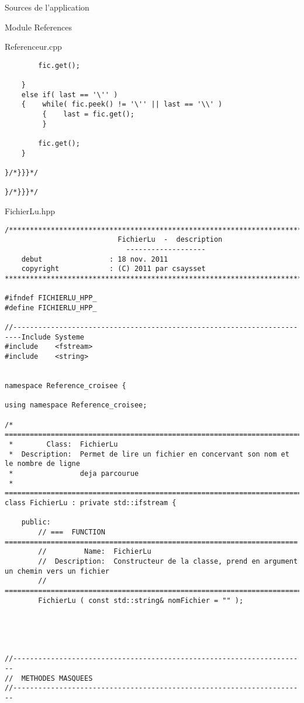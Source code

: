 \documentclass{article}
\begin{document}
\begin{section}{Sources de l'application}
\begin{subsection}{Module References}
\begin{paragraph}{Referenceur.cpp}
\begin{verbatim}
        fic.get();

    }
    else if( last == '\'' ) 
    {    while( fic.peek() != '\'' || last == '\\' ) 
         {    last = fic.get();
         }

        fic.get();
    }

}/*}}}*/

}/*}}}*/
  \end{verbatim}
  \end{paragraph}





\newpage
  \begin{paragraph}{FichierLu.hpp}
   \begin{verbatim}/*************************************************************************
                           FichierLu  -  description
                             -------------------
    debut                : 18 nov. 2011
    copyright            : (C) 2011 par csaysset
*************************************************************************/

#ifndef FICHIERLU_HPP_
#define FICHIERLU_HPP_

//------------------------------------------------------------------------Include Systeme
#include    <fstream>
#include    <string>


namespace Reference_croisee {

using namespace Reference_croisee;

/* =====================================================================================
 *        Class:  FichierLu
 *  Description:  Permet de lire un fichier en concervant son nom et le nombre de ligne
 *                deja parcourue
 * =====================================================================================*/
class FichierLu : private std::ifstream {

    public:
        // ===  FUNCTION  ======================================================================
        //         Name:  FichierLu
        //  Description:  Constructeur de la classe, prend en argument un chemin vers un fichier
        // =====================================================================================
        FichierLu ( const std::string& nomFichier = "" );





//----------------------------------------------------------------------
//  METHODES MASQUEES
//----------------------------------------------------------------------


\end{verbatim}
\end{paragraph}
\end{subsection}
\end{section}
\end{document}
